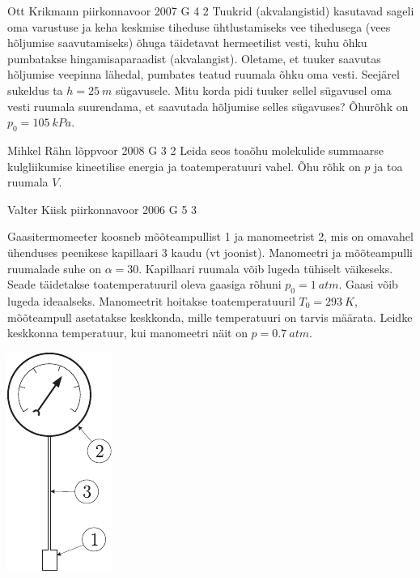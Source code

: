 \documentclass[11pt]{article}
\begin{document}
{%
{Ott Krikmann} %
{piirkonnavoor} %
{2007} %
{G 4} %
{2} %
{
\ifStatement
Tuukrid (akvalangistid) kasutavad sageli oma varustuse ja keha keskmise tiheduse ühtlustamiseks vee tihedusega (vees hõljumise saavutamiseks) õhuga täidetavat hermeetilist vesti, kuhu õhku pumbatakse hingamisaparaadist (akvalangist). Oletame, et tuuker saavutas hõljumise veepinna lähedal, pumbates teatud ruumala õhku oma vesti. Seejärel sukeldus ta $h = \SI{25}{m}$ sügavusele. Mitu korda pidi tuuker sellel sügavusel oma vesti ruumala suurendama, et saavutada hõljumise selles sügavuses? Õhurõhk on $p_0 = \SI{105}{kPa}$.
\fi
}

{Mihkel Rähn} %
{lõppvoor} %
{2008} %
{G 3} %
{2} %
{
\ifStatement
Leida seos toaõhu molekulide summaarse kulgliikumise kineetilise energia ja toatemperatuuri vahel. Õhu rõhk on $p$ ja toa ruumala $V$.
\fi
}

{Valter Kiisk} %
{piirkonnavoor} %
{2006} %
{G 5} %
{3} %
{
\ifStatement
Gaasitermomeeter koosneb mõõteampullist 1 ja manomeetrist 2, mis on omavahel ühenduses peenikese kapillaari 3 kaudu (vt joonist). Manomeetri ja mõõteampulli ruumalade suhe on $\alpha = 30$. Kapillaari ruumala võib lugeda tühiselt väikeseks. Seade täidetakse toatemperatuuril oleva gaasiga rõhuni $p_0 = \SI{1}{atm}$. Gaasi võib lugeda ideaalseks. Manomeetrit hoitakse toatemperatuuril $T_0 = \SI{293}{K}$, mõõteampull asetatakse keskkonda, mille temperatuuri on tarvis määrata. Leidke keskkonna temperatuur, kui manomeetri näit on $p = \SI{0,7}{atm}$.

\begin{center}
	\includegraphics[width=0.25\linewidth]{2006-v2g-05-yl}
\end{center}
\fi
}

}
\end{document}
